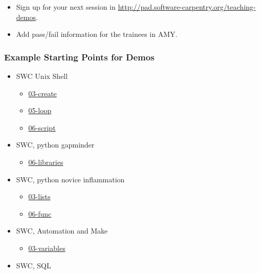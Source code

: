 \begin{itemize}
\itemsep1pt\parskip0pt
\item
  Sign up for your next session in
  \url{http://pad.software-carpentry.org/teaching-demos}.
\item
  Add pass/fail information for the trainees in AMY.
\end{itemize}

\subsubsection{Example Starting Points for
Demos}\label{example-starting-points-for-demos}

\begin{itemize}
\itemsep1pt\parskip0pt
\item
  SWC Unix Shell

  \begin{itemize}
  \itemsep1pt\parskip0pt
  \item
    \href{\{\{\%20site.swc_pages\%20\}\}/shell-novice/03-create/}{03-create}
  \item
    \href{\{\{\%20site.swc_pages\%20\}\}/shell-novice/05-loop/}{05-loop}
  \item
    \href{\{\{\%20site.swc_pages\%20\}\}/shell-novice/06-script/}{06-script}
  \end{itemize}
\item
  SWC, python gapminder

  \begin{itemize}
  \itemsep1pt\parskip0pt
  \item
    \href{\{\{\%20site.swc_pages\%20\}\}/python-novice-gapminder/06-libraries/}{06-libraries}
  \end{itemize}
\item
  SWC, python novice inflammation

  \begin{itemize}
  \itemsep1pt\parskip0pt
  \item
    \href{\{\{\%20site.swc_pages\%20\}\}/python-novice-inflammation/03-lists/}{03-lists}
  \item
    \href{\{\{\%20site.swc_pages\%20\}\}/python-novice-inflammation/06-func/}{06-func}
  \end{itemize}
\item
  SWC, Automation and Make

  \begin{itemize}
  \itemsep1pt\parskip0pt
  \item
    \href{\{\{\%20site.swc_pages\%20\}\}/make-novice/03-variables/}{03-variables}
  \end{itemize}
\item
  SWC, SQL


\end{itemize}

